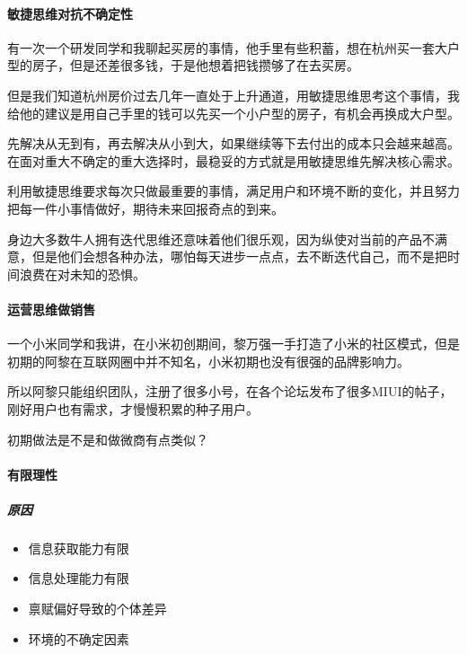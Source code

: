 \documentclass[letterpaper,10pt,english]{sphinxmanual}
\begin{document}
\paragraph{敏捷思维对抗不确定性}
\label{\detokenize{chapter_idea/idea:id4}}
有一次一个研发同学和我聊起买房的事情，他手里有些积蓄，想在杭州买一套大户型的房子，但是还差很多钱，于是他想着把钱攒够了在去买房。

但是我们知道杭州房价过去几年一直处于上升通道，用敏捷思维思考这个事情，我给他的建议是用自己手里的钱可以先买一个小户型的房子，有机会再换成大户型。

先解决从无到有，再去解决从小到大，如果继续等下去付出的成本只会越来越高。在面对重大不确定的重大选择时，最稳妥的方式就是用敏捷思维先解决核心需求。

利用敏捷思维要求每次只做最重要的事情，满足用户和环境不断的变化，并且努力把每一件小事情做好，期待未来回报奇点的到来。

身边大多数牛人拥有迭代思维还意味着他们很乐观，因为纵使对当前的产品不满意，但是他们会想各种办法，哪怕每天进步一点点，去不断迭代自己，而不是把时间浪费在对未知的恐惧。


\paragraph{运营思维做销售}
\label{\detokenize{chapter_idea/idea:id5}}
一个小米同学和我讲，在小米初创期间，黎万强一手打造了小米的社区模式，但是初期的阿黎在互联网圈中并不知名，小米初期也没有很强的品牌影响力。

所以阿黎只能组织团队，注册了很多小号，在各个论坛发布了很多MIUI的帖子，刚好用户也有需求，才慢慢积累的种子用户。

初期做法是不是和做微商有点类似？


\paragraph{有限理性}
\label{\detokenize{chapter_idea/idea:id6}}

\subparagraph{原因}
\label{\detokenize{chapter_idea/idea:id7}}\begin{itemize}
\item {} 
信息获取能力有限

\item {} 
信息处理能力有限

\item {} 
禀赋偏好导致的个体差异

\item {} 
环境的不确定因素

\end{itemize}
\end{document}
